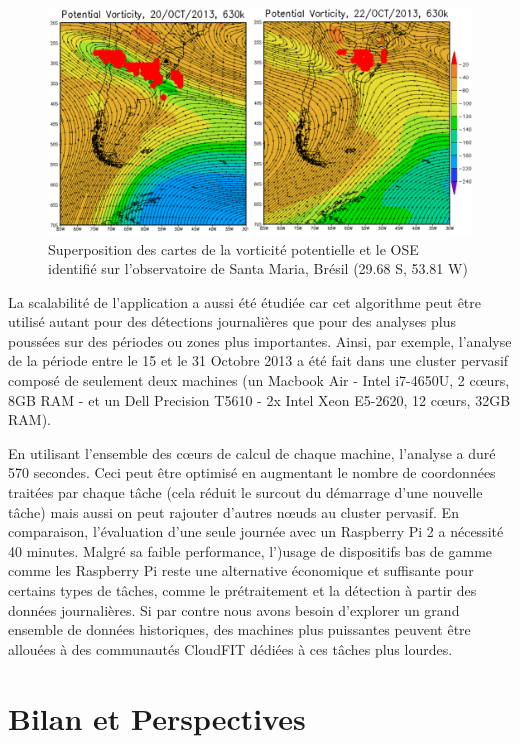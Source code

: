 \begin{figure}
	\centering
	\includegraphics[width=0.75\linewidth]{img/comparison2}
	\caption{Superposition des cartes de la vorticité potentielle et le OSE identifié sur l'observatoire de Santa Maria, Brésil (29.68 S, 53.81 W)}\label{fig:comparison}
\end{figure}

La scalabilité de l'application a aussi été étudiée car cet algorithme peut être utilisé autant pour des détections journalières que pour des analyses plus poussées sur des périodes ou zones plus importantes. Ainsi, par exemple, l'analyse de la période entre le 15 et le 31 Octobre 2013 a été fait dans une cluster pervasif composé de seulement deux machines (un Macbook Air  - Intel i7-4650U, 2 c{\oe}urs, 8GB RAM -  et un Dell Precision T5610 - 2x Intel Xeon E5-2620, 12 c{\oe}urs, 32GB RAM). 

En utilisant l'ensemble des c{\oe}urs de calcul de chaque machine, l'analyse a duré 570 secondes. Ceci peut être optimisé en augmentant le nombre de coordonnées traitées par chaque tâche (cela réduit le surcout du démarrage d'une nouvelle tâche) mais aussi on peut rajouter d'autres n{\oe}uds au cluster pervasif. En comparaison, l'évaluation d'une seule journée avec un Raspberry Pi 2 a nécessité 40 minutes. Malgré sa faible performance, l')usage de dispositifs bas de gamme comme les Raspberry Pi reste une alternative économique et suffisante pour certains types de tâches, comme le prétraitement et la détection à partir des données journalières. Si par contre nous avons besoin d'explorer un grand ensemble de données historiques, des machines plus puissantes peuvent être allouées à des communautés CloudFIT dédiées à ces tâches plus lourdes. 

\section{Bilan et Perspectives}